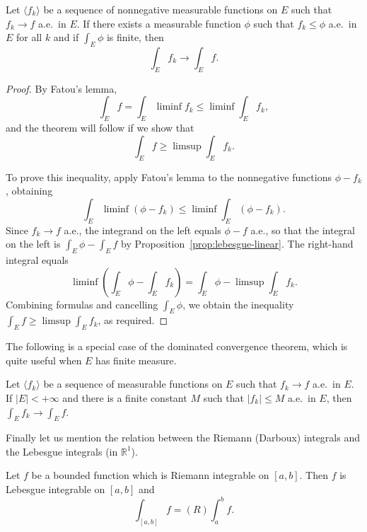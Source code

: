 \documentclass[11pt]{article}
\begin{document}
\begin{thm}
  Let $\langle f_k \rangle$ be a sequence of nonnegative measurable functions on $E$ such that $f_k \to f$ a.e.\ in $E$.  If there exists a measurable function $\phi$ such that $f_k \leqslant \phi$ a.e.\ in $E$ for all $k$ and if $\int_E \phi$ is finite, then
  \[
    \int_E f_k \to \int_E f.
  \]
\end{thm}

\begin{proof}
  By Fatou's lemma,
  \[
    \int_E f = \int_E \liminf f_k \leqslant \liminf \int_E f_k,
  \]
  and the theorem will follow if we show that
  \[
    \int_E f \geqslant \limsup \int_E f_k.
  \]
  
  To prove this inequality, apply Fatou's lemma to the nonnegative functions $\phi - f_k$, obtaining
  \[
    \int_E \liminf (\phi - f_k) \leqslant \liminf \int_E (\phi - f_k).
  \]
  Since $f_k \to f$ a.e., the integrand on the left equals $\phi - f$ a.e., so that the integral on the left is $\int_E \phi - \int_E f$ by Proposition~\ref{prop:lebesgue-linear}.  The right-hand integral equals
  \[
    \liminf \left( \int_E \phi - \int_E f_k \right) = \int_E \phi - \limsup \int_E f_k.
  \]
  Combining formulas and cancelling $\int_E \phi$, we obtain the inequality $\int_E f \geqslant \limsup \int_E f_k$, as required.
\end{proof}

The following is a special case of the dominated convergence theorem, which is quite useful when $E$ has finite measure.

\begin{cor}
  \label{cor:bounded-convergence-theorem}
  Let $\langle f_k \rangle$ be a sequence of measurable functions on $E$ such that $f_k \to f$ a.e.\ in $E$.  If $|E| < +\infty$ and there is a finite constant $M$ such that $|f_k| \leqslant M$ a.e.\ in $E$, then $\int_E f_k \to \int_E f$.
\end{cor}

Finally let us mention the relation between the Riemann (Darboux) integrals and the Lebesgue integrals (in $\mathbb{R}^1$).

\begin{thm}
  \label{thm:riemann-lebesgue-integral}
  Let $f$ be a bounded function which is Riemann integrable on $[a,b]$.  Then $f$ is Lebesgue integrable on $[a,b]$ and
  \[
    \int_{[a,b]} f = (R) \int_a^b f.
  \]
\end{thm}
\end{document}
